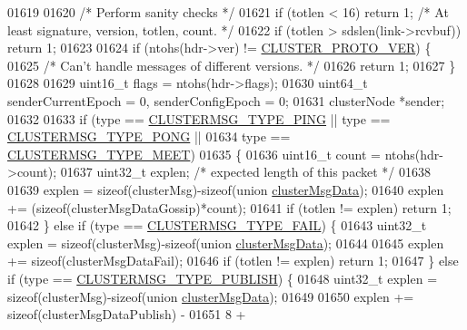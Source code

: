\begin{DoxyCode}
{{{{{{{{{{{{{{{{{{{{{{{01619 
01620     \textcolor{comment}{/* Perform sanity checks */}
01621     \textcolor{keywordflow}{if} (totlen < 16) \textcolor{keywordflow}{return} 1; \textcolor{comment}{/* At least signature, version, totlen, count. */}
01622     \textcolor{keywordflow}{if} (totlen > sdslen(link->rcvbuf)) \textcolor{keywordflow}{return} 1;
01623 
01624     \textcolor{keywordflow}{if} (ntohs(hdr->ver) != \hyperlink{cluster_8h_ad93688d5eca033b109b1a00bfb03cebe}{CLUSTER\_PROTO\_VER}) \{
01625         \textcolor{comment}{/* Can't handle messages of different versions. */}
01626         \textcolor{keywordflow}{return} 1;
01627     \}
01628 
01629     uint16\_t flags = ntohs(hdr->flags);
01630     uint64\_t senderCurrentEpoch = 0, senderConfigEpoch = 0;
01631     clusterNode *sender;
01632 
01633     \textcolor{keywordflow}{if} (type == \hyperlink{cluster_8h_aeb8a936505e22f64e5039523a3c96d4c}{CLUSTERMSG\_TYPE\_PING} || type == 
      \hyperlink{cluster_8h_a33e9439f462f28177a31dfc74de0c16b}{CLUSTERMSG\_TYPE\_PONG} ||
01634         type == \hyperlink{cluster_8h_aaf264f57ae1869c57093fd9fbc6fc5bc}{CLUSTERMSG\_TYPE\_MEET})
01635     \{
01636         uint16\_t count = ntohs(hdr->count);
01637         uint32\_t explen; \textcolor{comment}{/* expected length of this packet */}
01638 
01639         explen = \textcolor{keyword}{sizeof}(clusterMsg)-\textcolor{keyword}{sizeof}(\textcolor{keyword}{union} \hyperlink{unionclusterMsgData}{clusterMsgData});
01640         explen += (\textcolor{keyword}{sizeof}(clusterMsgDataGossip)*count);
01641         \textcolor{keywordflow}{if} (totlen != explen) \textcolor{keywordflow}{return} 1;
01642     \} \textcolor{keywordflow}{else} \textcolor{keywordflow}{if} (type == \hyperlink{cluster_8h_af5d51e3ad9965074b2124aabe1895d59}{CLUSTERMSG\_TYPE\_FAIL}) \{
01643         uint32\_t explen = \textcolor{keyword}{sizeof}(clusterMsg)-\textcolor{keyword}{sizeof}(\textcolor{keyword}{union} \hyperlink{unionclusterMsgData}{clusterMsgData});
01644 
01645         explen += \textcolor{keyword}{sizeof}(clusterMsgDataFail);
01646         \textcolor{keywordflow}{if} (totlen != explen) \textcolor{keywordflow}{return} 1;
01647     \} \textcolor{keywordflow}{else} \textcolor{keywordflow}{if} (type == \hyperlink{cluster_8h_a874fecfd3ff886c2c697f5649ebee5ee}{CLUSTERMSG\_TYPE\_PUBLISH}) \{
01648         uint32\_t explen = \textcolor{keyword}{sizeof}(clusterMsg)-\textcolor{keyword}{sizeof}(\textcolor{keyword}{union} \hyperlink{unionclusterMsgData}{clusterMsgData});
01649 
01650         explen += \textcolor{keyword}{sizeof}(clusterMsgDataPublish) -
01651                 8 +
}}}}}}}}}}}}}}}}}}}}}}}
\end{DoxyCode}
